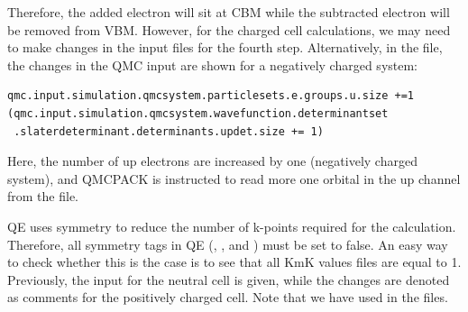 Therefore, the added electron will sit at CBM while the subtracted electron will be removed from VBM. 
However, for the charged cell calculations, we may need to make changes in the input files for the fourth step.  Alternatively, in the  file, the changes in the QMC input are shown for a negatively charged system:
\begin{lstlisting}[style=Python]
qmc.input.simulation.qmcsystem.particlesets.e.groups.u.size +=1
(qmc.input.simulation.qmcsystem.wavefunction.determinantset
 .slaterdeterminant.determinants.updet.size += 1)
\end{lstlisting}
Here, the number of up electrons are increased by one (negatively charged system), and QMCPACK is instructed to read more one orbital in the up channel from the  file. 

QE uses symmetry to reduce the number of k-points required for the calculation. 
Therefore, all symmetry tags in QE (, , and ) must be set to false. 
An easy way to check whether this is the case is to see that all KmK values  files are equal to 1. 
Previously, the input for the neutral cell is given, while the changes are denoted as comments for the positively charged cell. 
Note that we have used  in the  files.
